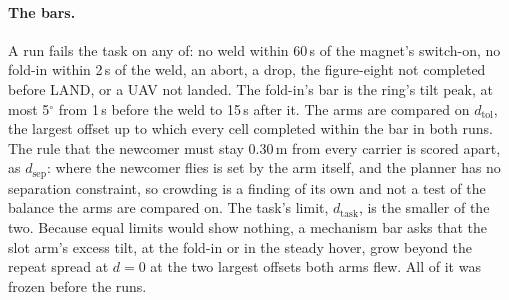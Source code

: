\paragraph{The bars.} A run fails the task on any of: no weld within 60\,s of the magnet's switch-on, no fold-in within
2\,s of the weld, an abort, a drop, the figure-eight not completed before LAND, or a UAV not landed. The fold-in's bar is
the ring's tilt peak, at most 5$^\circ$ from 1\,s before the weld to 15\,s after it. The arms are compared on
$d_\mathrm{tol}$, the largest offset up to which every cell completed within the bar in both runs. The rule that the
newcomer must stay 0.30\,m from every carrier is scored apart, as $d_\mathrm{sep}$: where the newcomer flies is set by
the arm itself, and the planner has no separation constraint, so crowding is a finding of its own and not a test of
the balance the arms are compared on. The task's limit, $d_\mathrm{task}$, is the smaller of the two. Because equal
limits would show nothing, a mechanism bar asks that the slot arm's excess tilt, at the fold-in or in the steady hover,
grow beyond the repeat spread at $d = 0$ at the two largest offsets both arms flew. All of it was frozen before the
runs.

